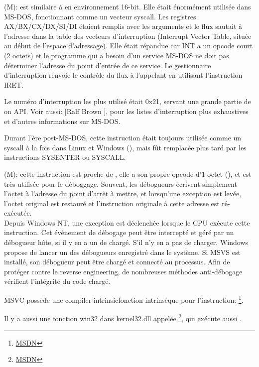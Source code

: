 
\item[INT] (M):  est similaire à 
en environnement 16-bit.
  Elle était énormément utilisée dans MS-DOS, fonctionnant comme un vecteur syscall.
  Les registres AX/BX/CX/DX/SI/DI étaient remplis avec les arguments et le flux sautait
  à l'adresse dans la table des vecteurs d'interruption (Interrupt Vector Table,
  située au début de l'espace d'adressage).
  Elle était répandue car INT a un opcode court (2 octets) et le programme qui a
  besoin d'un service MS-DOS ne doit pas déterminer l'adresse du point d'entrée de
  ce service.
  Le gestionnaire d'interruption renvoie le contrôle du flux à l'appelant en utilisant
  l'instruction IRET.

  Le numéro d'interruption les plus utilisé était 0x21, servant une grande partie
  de on \ac{API}.
  Voir aussi: [Ralf Brown ],
  pour les listes d'interruption plus exhaustives et d'autres informations sur MS-DOS.

  Durant l'ère post-MS-DOS, cette instruction était toujours utilisée comme un syscall
  à la fois dans Linux et Windows (), mais fût remplacée plus tard
  par les instructions SYSENTER ou SYSCALL.

\item[INT 3] (M): cette instruction est proche de
, elle a son propre opcode d'1 octet (),
et est très utilisée pour le déboggage.
Souvent, les débogueurs écrivent simplement l'octet  à l'adresse du point
d'arrêt à mettre, et lorsqu'une exception est levée, l'octet original est restauré
et l'instruction originale à cette adresse est ré-exécutée. \\
Depuis \gls{Windows NT}, une exception  est déclenchée
lorsque le \ac{CPU} exécute cette instruction.
Cet évènement de débogage peut être intercepté et géré par un débogueur hôte, si
il y en a un de chargé.
S'il n'y en a pas de charger, Windows propose de lancer un des débogueurs enregistré
dans le système.
Si \ac{MSVS} est installé, son débogueur peut être chargé et connecté au processus.
Afin de protéger contre le \gls{reverse engineering}, de nombreuses méthodes anti-débogage
vérifient l'intégrité du code chargé.

\ac{MSVC} possède une \gls{compiler intrinsic}{fonction intrinsèque} pour l'instruction:
\footnote{\href{http://go.yurichev.com/17226}{MSDN}}.


Il y a aussi une fonction win32 dans kernel32.dll appelée
\footnote{\href{http://go.yurichev.com/17227}{MSDN}},
qui exécute aussi .

